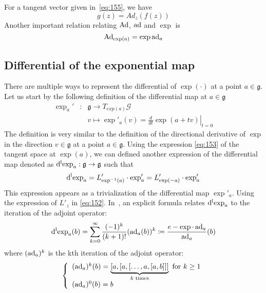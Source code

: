 For a tangent vector given in~\eqref{eq:155}, we have
\begin{equation}
  \label{eq:151}
  g(z) = Ad_z(f(z))
\end{equation}
Another important relation relating $\operatorname{Ad}$, $\operatorname{ad}$ and $\exp$ is
\begin{equation}
  \label{eq:164}
  \operatorname{Ad}_{\exp(a)} =\exp{\operatorname{ad}_a}
\end{equation}


\subsection{Differential of the exponential map} There are multiple ways to represent the differential of $\exp(\cdot)$ at a point $a\in \mathfrak g$. Let us start by the following definition of the differential map at $a\in\mathfrak g$
\begin{equation}
  \label{eq:147}
  \begin{array}{lcl}
    \exp_a' & : & \mathfrak g \rightarrow  T_{exp(a)}\mathcal G\\
            & &  v \mapsto \exp'_a(v)  = \left.\frac{d}{dt} \exp(a+tv)\right|_{t=0}
  \end{array}
\end{equation}
The definition is very similar to the definition of the directional derivative of $\exp$ in the direction $v \in \mathfrak g$ at a point $a\in\mathfrak g$. Using the expression \eqref{eq:153} of the tangent space at $\exp(a)$, we can defined another expression of the differential map denoted as $\operatorname{d^l exp}_a : \mathfrak g  \rightarrow \mathfrak g$ such that
\begin{equation}
  \label{eq:156}
  \operatorname{d^l exp}_a = L'_{\exp^{-1}(a)} \cdot \exp_a' = L'_{\exp(-a)} \cdot \exp_a' 
\end{equation}
This expression appears as a trivialization of the differential map $\exp'_a$. Using the expression of $L'_z$ in \eqref{eq:152}.
In~\cite[Theorem 2.14.13]{Varadarajan_book1984}, an explicit formula relates $\operatorname{d^l exp}_{a}$ to the iteration of the adjoint operator:
\begin{equation}
  \label{eq:43}
  \operatorname{d^l exp}_a(b) = \sum_{k=0}^\infty \frac{(-1)^k}{(k+1)!} (\operatorname{ad}_a(b))^k \coloneqq \frac{e - \exp\cdot\operatorname{ad}_a}{\operatorname{ad}_a}(b)
\end{equation}
where $(\operatorname{ad}_a)^k$ is the kth iteration of the adjoint operator:
\begin{equation}
  \label{eq:44}
  \left\{\begin{array}[l]{l}
    (\ad_a)^k(b) = \underbrace{[a, [ a, [ \ldots, a, [ a, b]]]}_{k \text{ times}} \text{ for } k \geq 1 \\
    (\ad_a)^0(b)  = b
  \end{array}\right.
\end{equation}
